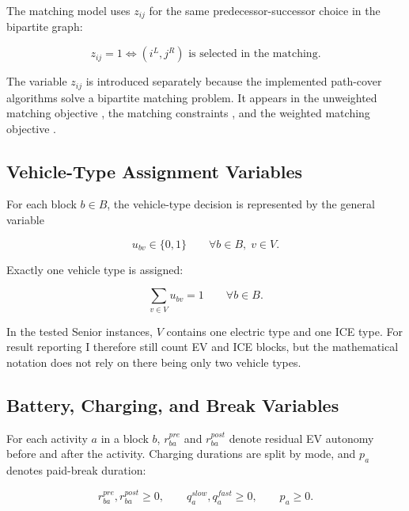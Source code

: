The matching model uses \(z_{ij}\) for the same predecessor-successor choice in
the bipartite graph:

\begin{equation}
z_{ij}=1
\Longleftrightarrow
(i^L,j^R)\text{ is selected in the matching}.
\label{eq:matching-variable}
\end{equation}

The variable \(z_{ij}\) is introduced separately because the implemented
path-cover algorithms solve a bipartite matching problem. It appears in the
unweighted matching objective , the matching
constraints , and
the weighted matching objective .

\subsection{Vehicle-Type Assignment Variables}

For each block \(b\in B\), the vehicle-type decision is represented by the
general variable

\begin{equation}
u_{bv}\in\{0,1\}
\qquad
\forall b\in B,\; v\in V.
\label{eq:fleet-variable-domain}
\end{equation}

Exactly one vehicle type is assigned:

\begin{equation}
\sum_{v\in V}u_{bv}=1
\qquad
\forall b\in B.
\label{eq:fleet-one-type}
\end{equation}

In the tested Senior instances, \(V\) contains one electric type and one ICE
type. For result reporting I therefore still count EV and ICE blocks, but the
mathematical notation does not rely on there being only two vehicle types.

\subsection{Battery, Charging, and Break Variables}

For each activity \(a\) in a block \(b\), \(r_{ba}^{pre}\) and
\(r_{ba}^{post}\) denote residual EV autonomy before and after the activity.
Charging durations are split by mode, and \(p_a\) denotes paid-break duration:

\begin{equation}
r_{ba}^{pre},r_{ba}^{post}\ge 0,\qquad
q_a^{slow},q_a^{fast}\ge 0,\qquad p_a\ge 0.
\label{eq:state-variable-domains}
\end{equation}

